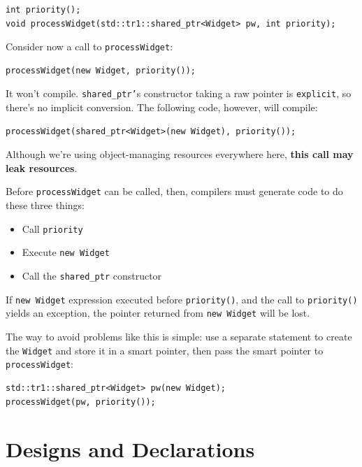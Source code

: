\documentclass[a4paper,twoside]{article}
\theoremstyle{definition}
\theoremstyle{remark}
\numberwithin{equation}{section}
\let\OldTexttt\texttt
\renewcommand{\texttt}[1]{{\color{blue} \OldTexttt{#1}}}
\begin{document}
\begin{verbatim}
int priority();
void processWidget(std::tr1::shared_ptr<Widget> pw, int priority);
\end{verbatim}

Consider now a call to \texttt{processWidget}:
\begin{verbatim}
processWidget(new Widget, priority());
\end{verbatim}

It won't compile. \texttt{shared\_ptr'}s constructor taking a raw
pointer is \texttt{explicit}, so there's no implicit conversion. The
following code, however, will compile: 
\begin{verbatim}
processWidget(shared_ptr<Widget>(new Widget), priority());
\end{verbatim}

Although we're using object-managing resources everywhere here,
\textbf{this call may leak resources}.

Before \texttt{processWidget} can be called, then, compilers must generate
code to do these three things:
\begin{itemize}
\item Call \texttt{priority}
\item Execute \texttt{new Widget}
\item Call the \texttt{shared\_ptr} constructor
\end{itemize}

If \texttt{new Widget} expression executed before \texttt{priority()},
and  the call to \texttt{priority()} yields an exception, the pointer
returned from \texttt{new Widget} will be lost.

The way to avoid problems like this is simple: use a separate
statement to create the \texttt{Widget} and store it in a smart pointer, then
pass the smart pointer to \texttt{processWidget}:

\begin{verbatim}
std::tr1::shared_ptr<Widget> pw(new Widget); 
processWidget(pw, priority());
\end{verbatim}

\clearpage
\section{Designs and Declarations}



\end{document}
